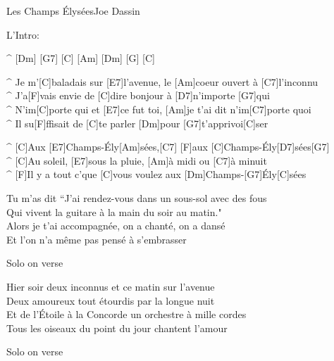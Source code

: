 \begin{song}{Les Champs Élysées}{Joe Dassin}

\begin{guitar}
L'Intro:   \\
\end{guitar}

\begin{guitar}
^ [Dm] [G7] [C] [Am] [Dm] [G] [C]\\

\end{guitar}
\begin{guitar}
^ Je m'[C]baladais sur [E7]l'avenue, le [Am]coeur ouvert à [C7]l'inconnu\\
^ J'a[F]vais envie de [C]dire bonjour à [D7]n'importe [G7]qui\\
^ N'im[C]porte qui et [E7]ce fut toi, [Am]je t'ai dit n'im[C7]porte quoi\\
^ Il su[F]ffisait de [C]te parler [Dm]pour [G7]t'apprivoi[C]ser\\
\end{guitar}

\begin{guitar}
^ [C]Aux [E7]Champs-Ély[Am]sées,[C7]    [F]aux [C]Champs-Ély[D7]sées[G7]\\
^ [C]Au soleil, [E7]sous la pluie, [Am]à midi ou [C7]à minuit\\
^ [F]Il y a tout c'que [C]vous voulez aux [Dm]Champs-[G7]Ély[C]sées\\
\end{guitar}
\newpage
{}
\begin{guitar}
Tu m'as dit ``J'ai rendez-vous dans un sous-sol avec des fous\\
Qui vivent la guitare à la main du soir au matin."\\
Alors je t'ai accompagnée, on a chanté, on a dansé\\
Et l'on n'a même pas pensé à s'embrasser\\
\end{guitar}


\begin{guitar}
Solo on verse\\
\end{guitar}

\begin{guitar}
Hier soir deux inconnus et ce matin sur l'avenue\\
Deux amoureux tout étourdis par la longue nuit\\
Et de l'Étoile à la Concorde un orchestre à mille cordes\\
Tous les oiseaux du point du jour chantent l'amour\\
\end{guitar}


\begin{guitar}
Solo on verse\\
\end{guitar}
\end{song}
